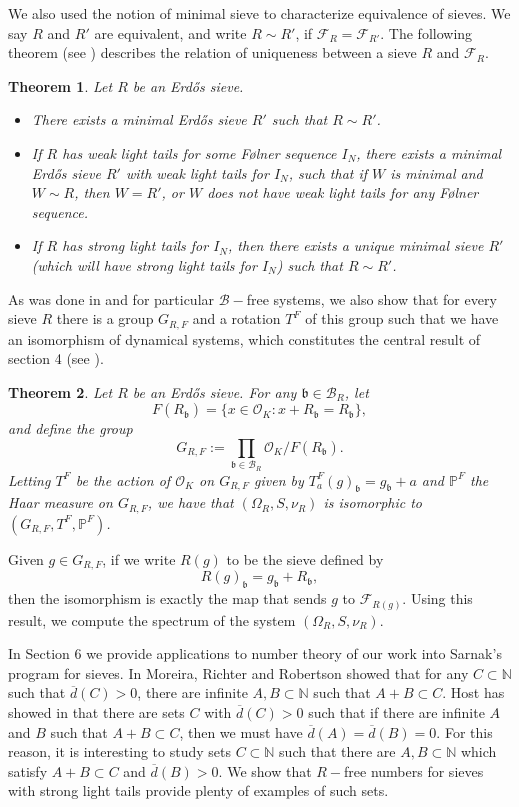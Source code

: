 \documentclass[a4paper,11pt,reqno]{amsart}
\theoremstyle{plain}
\newtheorem{theorem}{Theorem}[section]
\theoremstyle{remark}
\newcommand{\cb}{\mathcal{B}}
\newcommand{\co}{\mathcal{O}}
\newcommand{\cf}{\mathcal{F}}
\newcommand{\fr}{\mathcal{F}_R}
\newcommand{\frp}{\mathcal{F}_{R'}}
\newcommand{\gb}{\mathfrak{b}}
\newcommand{\grf}{G_{R,F}}
\newcommand{\mmp}{\mathbb{P}}
\begin{document}
	We also used the notion of minimal sieve to characterize equivalence of sieves. We say $R$ and $R'$ are equivalent, and write $R \sim R'$, if $\fr = \frp$. The following theorem (see ) describes the relation of uniqueness between a sieve $R$ and $\fr$.
	
	\begin{theorem}
		\label{thm: intro minimal sieves}
		Let $R$ be an Erdős sieve. 
		\begin{itemize}
			\item There exists a minimal Erdős sieve $R'$ such that $R \sim R'$.
			\item If $R$ has weak light tails for some Følner sequence $I_N$, there exists a minimal Erdős sieve $R'$  with weak light tails for $I_N$, such that if $W$ is minimal and $W \sim R$, then $W = R'$, or $W$ does not have weak light tails for any Følner sequence.
			\item If $R$ has strong light tails for $I_N$, then there exists a unique minimal sieve $R'$ (which will have strong light tails for $I_N$) such that $R \sim R'$. 
		\end{itemize}
	\end{theorem}
	
 As was done in \cite{Bartnicka} and \cite{celarosi2} for particular $\cb-$free systems, we also show that for every sieve $R$ there is a group $\grf$ and a rotation $T^F$ of this group such that we have an isomorphism of dynamical systems, which constitutes the central result of section 4 (see ).
	
	\begin{theorem}
		\label{thm: intro main thm}
		Let $R$ be an Erdős sieve. For any $\gb \in \cb_R$, let $$F(R_\gb) = \{x \in \co_K:x+R_\gb = R_\gb\},$$ and define the group $$\grf := \prod_{\gb \in \cb_R}\co_K/F(R_\gb).$$ Letting $T^F$ be the action of $\co_K$ on $\grf$ given by $T^F_a(g)_\gb = g_\gb+a$ and $\mmp^F$ the Haar measure on $\grf$, we have that  $(\Omega_R,S,\nu_R)$ is isomorphic to $(\grf,T^F, \mmp^F)$.
	\end{theorem}

Given $g  \in \grf$, if we write $R(g)$ to be the sieve defined by $$R(g)_\gb = g_\gb + R_\gb,$$ then the isomorphism is exactly the map that sends $g$ to $\cf_{R(g)}$. Using this result, we compute the spectrum of the system $(\Omega_R,S,\nu_R)$.
	
	
	In Section 6 we provide applications to number theory of our work into Sarnak's program for sieves. In \cite{Moreira} Moreira, Richter and Robertson showed that  for any $C\subset \mathbb{N}$ such that $\overline{d}(C)>0$, there are infinite $A,B \subset \mathbb{N}$ such that $A+B \subset C$. Host has showed in \cite{Host} that there are sets $C$ with $\overline{d}(C)>0$ such that if there are infinite $A$ and $B$ such that $A+B \subset C$, then we must have $\overline{d}(A) = \overline{d}(B) = 0$. For this reason, it is interesting to study sets $C\subset \mathbb{N}$ such that there are $A,B\subset \mathbb{N}$ which satisfy $A+B \subset C$ and $\overline{d}(B) >0$. We show that $R-$free numbers for sieves with strong light tails provide plenty of examples of such sets.
	
\end{document}
